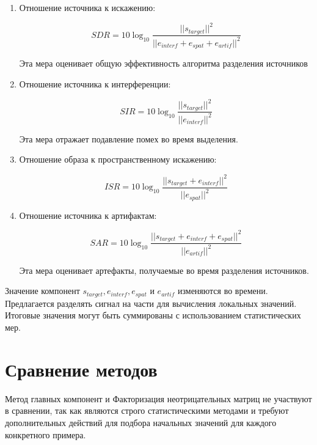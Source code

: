 \begin{enumerate}
	\item Отношение источника к искажению:
	
	\begin{equation}
		SDR = 10 \log_{10} \frac{|| s_{target} ||^2}{|| e_{interf} + e_{spat} + e_{artif} ||^2}
	\end{equation}
	
	Эта мера оценивает общую эффективность алгоритма разделения источников
	
	\item  Отношение источника к интерференции:
	
	\begin{equation}
		SIR = 10 \log_{10} \frac{|| s_{target} ||^2}{|| e_{interf} ||^2}
	\end{equation}
	
	Эта мера отражает подавление помех во время выделения.
	
	\item Отношение образа к пространственному искажению:
	
	\begin{equation}
	ISR = 10 \log_{10} \frac{|| s_{target} + e_{interf} ||^2}{|| e_{spat} ||^2}
	\end{equation}
	
	\item Отношение источника к артифактам:
	
	\begin{equation}
	SAR = 10 \log_{10} \frac{|| s_{target} + e_{interf} + e_{spat} ||^2}{|| e_{artif} ||^2}
	\end{equation}
	
	Эта мера оценивает артефакты, получаемые во время разделения источников.
\end{enumerate}

Значение компонент $s_{target}, e_{interf}, e_{spat}$ и $e_{artif}$ изменяются во времени. Предлагается разделять сигнал на части для вычисления локальных значений. Итоговые значения могут быть суммированы с использованием статистических мер.

\section{Сравнение методов}

Метод главных компонент и Факторизация неотрицательных матриц не участвуют в сравнении, так как являются строго статистическими методами и требуют дополнительных действий для подбора начальных значений для каждого конкретного примера.

